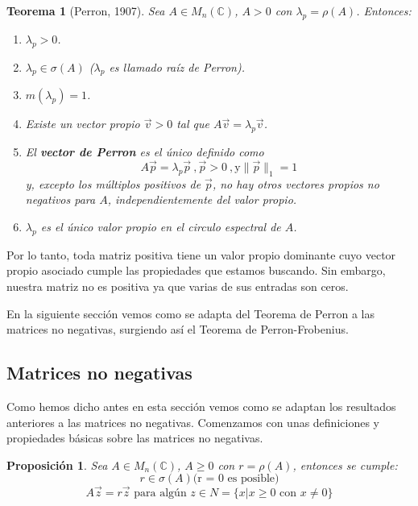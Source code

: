 \documentclass[size=a4, parskip=half, titlepage=false, toc=flat, toc=bib, 12pt]{scrartcl}
\theoremstyle{theorem-style}
\newtheorem{nth}{Teorema}[section]
\newtheorem{nprop}{Proposición}[section]
\theoremstyle{definition-style}
\theoremstyle{remark-style}
\theoremstyle{example-style}
\theoremstyle{definition-style}
\theoremstyle{remark-style}
\begin{document}
\begin{nth}[Perron, 1907]
\label{perron}
Sea $A \in M_n(\mathbb{C})$, $A > 0$ con $\lambda_p = \rho(A)$. Entonces:
\begin{enumerate}
\item $\lambda_p >0$.
\item $\lambda_p \in \sigma(A)$ ($\lambda_p$ es llamado raíz de Perron).
\item $m(\lambda_p) = 1$.
\item Existe un vector propio $\vec{v} >0$ tal que $A\vec{v} = \lambda_p \vec{v}$.
\item El \textbf{vector de Perron} es el único definido como
$$A\vec{p} = \lambda_p \vec{p} \ , \vec{p} > 0 \ , \textrm{y} \|\vec{p}\|_1 = 1 $$
y, excepto los múltiplos positivos de $\vec{p}$, no hay otros vectores propios no negativos para $A$, independientemente del valor propio.
\item $\lambda_p$ es el único valor propio en el circulo espectral de $A$.
\end{enumerate}
\end{nth}

Por lo tanto, toda matriz positiva tiene un valor propio dominante cuyo vector propio asociado cumple las propiedades que estamos buscando. Sin embargo, nuestra matriz no es positiva ya que varias de sus entradas son ceros.

En la siguiente sección vemos como se adapta del Teorema de Perron a las matrices no negativas, surgiendo así el Teorema de Perron-Frobenius.

\subsection{Matrices no negativas}

Como hemos dicho antes en esta sección vemos como se adaptan los resultados anteriores a las matrices no negativas. Comenzamos con unas definiciones y propiedades básicas sobre las matrices no negativas.

\begin{nprop}
Sea $A \in M_n(\mathbb{C})$, $A \geq 0$ con $r = \rho(A)$, entonces se cumple:
\begin{equation} r \in \sigma(A) \textrm{(r = 0 es posible)} \end{equation}
\begin{equation} \label{vectorpropio} A\vec{z} = r\vec{z} \textrm{ para algún } z \in N = \{x | x \geq 0 \textrm{ con } x \neq 0 \} \end{equation}
\end{nprop}
\end{document}
